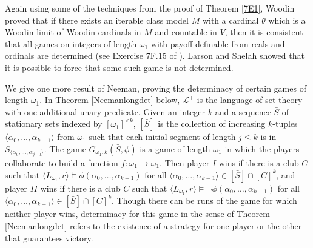 \documentclass{book}%
\newcommand{\game}{\rotate[u]{\rotate[f]{$\Game$}}}
\newcommand{\less}{\mathord{<}}
\newcommand{\thing}{\mathord{-}}
\begin{document}
Again using some of the techniques from the proof of Theorem
\ref{7E1}, Woodin proved that if there exists an iterable class
model $M$ with a cardinal $\theta$ which is a Woodin limit of Woodin
cardinals in $M$ and countable in $V$, then it is consistent that
all games on integers of length $\omega_{1}$ with payoff definable
from reals and ordinals are determined (see Exercise 7F.15 of
\cite{Neeman:DLG}). Larson and Shelah 
showed that it is possible to force that some such game is not
determined.


We give one more result of Neeman, proving the determinacy of
certain games of length $\omega_{1}$. In Theorem \ref{Neemanlongdet}
below, $\mathcal{L}^{+}$ is the language of set theory with one
additional unary predicate. Given an integer $k$ and a sequence
$\bar{S}$ of stationary sets indexed by $[\omega_{1}]^{\less k}$,
$[\bar{S}]$ is the collection of increasing $k$-tuples $\langle
\alpha_{0}, \ldots, \alpha_{k-1}\rangle$ from $\omega_{1}$ such that
each initial segment of length $j \leq k$ is in $S_{\langle
\alpha_{0},\ldots,\alpha_{j-l}\rangle}$. The game $G_{\omega_{1},
k}(\bar{S}, \phi)$ is a game of length $\omega_{1}$ in which the
players collaborate to build a function $f \colon \omega_{1} \to
\omega_{1}$. Then player $I$ wins if there is a club $C$ such that
$\langle L_{\omega_{1}}, r\rangle \models
\phi(\alpha_{0},\ldots,\alpha_{k-1})$ for all $\langle
\alpha_{0},\ldots,\alpha_{k-1}\rangle \in [\bar{S}] \cap [C]^{k}$,
and player $II$ wins if there is a club $C$ such that $\langle
L_{\omega_{1}}, r\rangle \models
\neg\phi(\alpha_{0},\ldots,\alpha_{k-1})$ for all $\langle
\alpha_{0},\ldots,\alpha_{k-1}\rangle \in [\bar{S}] \cap [C]^{k}$.
Though there can be runs of the game for which neither player wins,
determinacy for this game in the sense of Theorem
\ref{Neemanlongdet} refers to the existence of a strategy for one
player or the other that guarantees victory.



\end{document}
